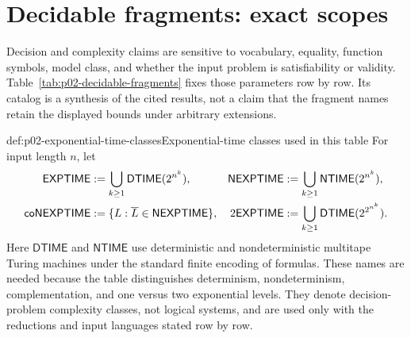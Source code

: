 \section{Decidable fragments: exact scopes}
\label{sec:p02-decidable-fragments}

Decision and complexity claims are sensitive to vocabulary, equality,
function symbols, model class, and whether the input problem is satisfiability
or validity.  Table~\ref{tab:p02-decidable-fragments} fixes those parameters
row by row.  Its catalog is a synthesis of the cited results, not a claim that
the fragment names retain the displayed bounds under arbitrary extensions.

\begin{hbdefinition}{def:p02-exponential-time-classes}{Exponential-time classes used in this table}
For input length \(n\), let
\[
\begin{aligned}
 \mathsf{EXPTIME}&\mathrel{:=}\bigcup_{k\geq1}\mathsf{DTIME}(2^{n^k}),&
 \mathsf{NEXPTIME}&\mathrel{:=}\bigcup_{k\geq1}\mathsf{NTIME}(2^{n^k}),\\
 \mathsf{coNEXPTIME}&\mathrel{:=}
   \{L:\overline L\in\mathsf{NEXPTIME}\},&
 2\mathsf{EXPTIME}&\mathrel{:=}
   \bigcup_{k\geq1}\mathsf{DTIME}(2^{2^{n^k}}).
\end{aligned}
\]
Here \(\mathsf{DTIME}\) and \(\mathsf{NTIME}\) use deterministic and
nondeterministic multitape Turing machines under the standard finite encoding
of formulas.  These names are needed because the table distinguishes
determinism, nondeterminism, complementation, and one versus two exponential
levels.  They denote decision-problem complexity classes, not logical systems,
and are used only with the reductions and input languages stated row by row.
\end{hbdefinition}

